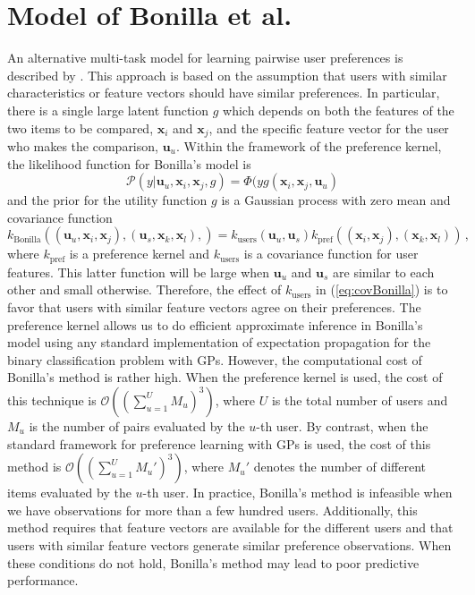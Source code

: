 \documentclass{article}
\begin{document}
\section{Model of Bonilla et al.}

An alternative multi-task model for learning pairwise user preferences is described by \cite{Bonilla2010}.
This approach is based on the assumption that users with similar characteristics or feature vectors should
have similar preferences. In particular, there is a single large latent function $g$ which depends on both
the features of the two items to be compared, $\mathbf{x}_i$ and $\mathbf{x}_j$, and
the specific feature vector for the user who makes the comparison, $\mathbf{u}_u$.
Within the framework of the preference kernel, the likelihood function for Bonilla's model is
\begin{equation}
\mathcal{P}(y|\mathbf{u}_u,\mathbf{x}_i,\mathbf{x}_j,g) = \Phi(yg(\mathbf{x}_i,\mathbf{x}_j,\mathbf{u}_u)
\end{equation}
and the prior for the utility function $g$ is a Gaussian process with zero mean and covariance function 
\begin{equation}
k_\text{Bonilla}((\mathbf{u}_u,\mathbf{x}_i,\mathbf{x}_j), (\mathbf{u}_s,\mathbf{x}_k,\mathbf{x}_l),) =
k_\text{users}(\mathbf{u}_u,\mathbf{u}_s)k_\text{pref}((\mathbf{x}_i,\mathbf{x}_j),(\mathbf{x}_k,\mathbf{x}_l))\,,\label{eq:covBonilla}
\end{equation}
where $k_\text{pref}$ is a preference kernel and $k_\text{users}$ is a covariance function for user features. This latter
function will be large when $\mathbf{u}_u$ and $\mathbf{u}_s$ are similar to each other and small otherwise.
Therefore, the effect of $k_\text{users}$ in (\ref{eq:covBonilla}) is to favor that users with similar feature vectors
agree on their preferences. The preference kernel allows us to do efficient approximate inference in Bonilla's model
using any standard implementation of expectation propagation for the binary classification problem with GPs.
However, the computational cost of Bonilla's method is rather high. 
When the preference kernel is used, the cost of this technique is $\mathcal{O}((\sum_{u=1}^U M_u)^3)$,
where $U$ is the total number of users and $M_u$ is the number of pairs evaluated by the $u$-th user.
By contrast, when the standard framework for preference learning with GPs is used, the cost of
this method is $\mathcal{O}((\sum_{u=1}^U M_u')^3)$, where $M_u'$ denotes the number of
different items evaluated by the $u$-th user. In practice, Bonilla's method is infeasible when
we have observations for more than a few hundred users. Additionally, this method 
requires that feature vectors are available for the different users and that users with similar feature vectors 
generate similar preference observations. When these conditions do not hold, Bonilla's method may
lead to poor predictive performance.
\end{document}
